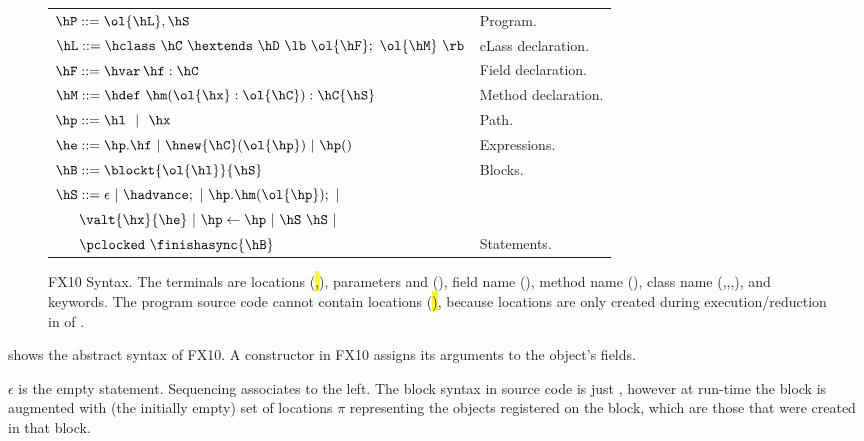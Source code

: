 \begin{figure}[t]
\begin{center}
\begin{tabular}{|l|l|}
\hline

$\hP ::= \ol{\hL},\hS$ & Program. \\

$\hL ::= \hclass ~ \hC~\hextends~\hD~\lb~\ol{\hF};~\ol{\hM}~\rb$
& cLass declaration. \\

$\hF ::= \hvar\,\hf:\hC$
& Field declaration. \\

$\hM ::= \hdef\ \hm(\ol{\hx}:\ol{\hC}):\hC\{\hS\}$
& Method declaration. \\

$\hp ::= \hl ~~|~~ \hx$
& Path. \\ %

$\he ::=  \hp.\hf  ~|~ \hnew{\hC}(\ol{\hp}) ~|~ \hp()$
& Expressions. \\ %
$\hB ::= \blockt{\ol{\hl}}{\hS}$
& Blocks. \\
$\hS ::=  \epsilon ~|~ \hadvance; ~|~ \hp.\hm(\ol{\hp}); ~|~$ &  \\
$~~~~~ \valt{\hx}{\he} ~|~ \hp \leftarrow \hp ~|~ \hS~\hS ~|~  $ &\\
$~~~~~ \pclocked~\finishasync{\hB} $ & Statements. \\ %

\hline
\end{tabular}
\end{center}
FX10 Syntax.
    The terminals are locations (\hl,\ha), parameters and \hthis (\hx), field name (\hf), method name (\hm), class name (\hB,\hC,\hD,\hObject),
        and keywords. %
    The program source code cannot contain locations (\hl), because locations are only created during execution/reduction in  of .

\label{Figure:syntax}
\end{figure}

 shows the abstract syntax of FX10.
A constructor in FX10 assigns its arguments to the object's fields.

$\epsilon$ is the empty statement. Sequencing associates to the left.
The block syntax in source code is just \code{\{\hS{}\}},
however at run-time the block is augmented with (the initially empty) set of locations
$\pi$ representing the objects registered on the block,
     which are those that were created in that block.

